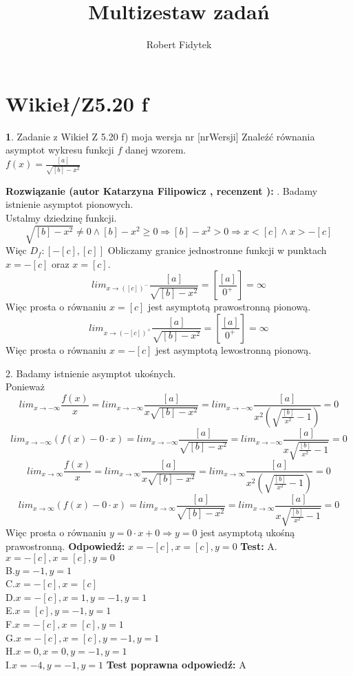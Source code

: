\documentclass[12pt, a4paper]{article}
\title{Multizestaw zadań}
\author{Robert Fidytek}
\date{}
\theoremstyle{definition} %
\newtheorem{zad}{}
\newcommand{\kategoria}[1]{\section{#1}} %
\newcommand{\zadStart}[1]{\begin{zad}#1\newline} %
\newcommand{\zadStop}{\end{zad}}   %
\newcommand{\rozwStart}[2]{\noindent \textbf{Rozwiązanie (autor #1 , recenzent #2): }\newline} %
\newcommand{\rozwStop}{\newline}                                            %
\newcommand{\odpStart}{\noindent \textbf{Odpowiedź:}\newline}    %
\newcommand{\odpStop}{\newline}                                             %
\newcommand{\testStart}{\noindent \textbf{Test:}\newline} %
\newcommand{\testStop}{\newline} %
\newcommand{\kluczStart}{\noindent \textbf{Test poprawna odpowiedź:}\newline} %
\newcommand{\kluczStop}{\newline} %
\begin{document}
\maketitle


\kategoria{Wikieł/Z5.20 f}
\zadStart{Zadanie z Wikieł Z 5.20 f) moja wersja nr [nrWersji]}
Znaleźć równania asymptot wykresu funkcji $f$ danej wzorem.\\
 $f(x)=\frac{[a]}{\sqrt{[b]-x^2}}$
\zadStop
\rozwStart{Katarzyna Filipowicz}{}
1. Badamy istnienie asymptot pionowych.\\
Ustalmy dziedzinę funkcji.\\
$$
\sqrt{[b]-x^2}\neq0 \wedge [b]-x^2\geq 0\Rightarrow  [b]-x^2>0 \Rightarrow x<[c] \wedge x>-[c]
$$
Więc $D_f:[-[c],[c]]$
Obliczamy granice jednostronne funkcji w punktach $x=-[c]$ oraz $x=[c]$.
$$
lim_{x\rightarrow ([c])^{-}}\frac{[a]}{\sqrt{[b]-x^2}}
=\left[\frac{[a]}{0^{+}}\right]=\infty
$$
Więc prosta o równaniu $x=[c]$ jest asymptotą prawostronną  pionową.
$$
lim_{x\rightarrow (-[c])^{+}}\frac{[a]}{\sqrt{[b]-x^2}}
=\left[\frac{[a]}{0^{+}}\right]=\infty
$$
Więc prosta o równaniu $x=-[c]$ jest asymptotą lewostronną pionową.


2. Badamy istnienie asymptot ukośnych.\\
Ponieważ
$$ 
lim_{x\rightarrow-\infty} \frac{f(x)}{x}
=lim_{x\rightarrow-\infty}\frac{[a]}{x\sqrt{[b]-x^2}}
=lim_{x\rightarrow-\infty}\frac{[a]}{x^2(\sqrt{\frac{[b]}{x^2}-1})}=0
$$ $$
lim_{x\rightarrow-\infty}(f(x)-0\cdot x)
=lim_{x\rightarrow-\infty}\frac{[a]}{\sqrt{[b]-x^2}}
=lim_{x\rightarrow-\infty} \frac{[a]}{x\sqrt{\frac{[b]}{x^2}-1}}=0
$$
$$ 
lim_{x\rightarrow\infty} \frac{f(x)}{x}
=lim_{x\rightarrow\infty}\frac{[a]}{x\sqrt{[b]-x^2}}
=lim_{x\rightarrow\infty}\frac{[a]}{x^2(\sqrt{\frac{[b]}{x^2}-1})}=0
$$ $$
lim_{x\rightarrow\infty}(f(x)-0\cdot x)
=lim_{x\rightarrow\infty}\frac{[a]}{\sqrt{[b]-x^2}}
=lim_{x\rightarrow\infty} \frac{[a]}{x\sqrt{\frac{[b]}{x^2}-1}}=0
$$
Więc prosta o równaniu $y=0\cdot x+0 \Rightarrow y=0$ jest asymptotą ukośną prawostronną.
\rozwStop
\odpStart
$x=-[c],x=[c],y=0$
\odpStop
\testStart
A.$x=-[c],x=[c],y=0$\\
B.$y=-1,y=1$\\
C.$x=-[c],x=[c]$\\
D.$x=-[c],x=1,y=-1,y=1$\\
E.$x=[c],y=-1,y=1$\\
F.$x=-[c],x=[c],y=1$\\
G.$x=-[c],x=[c],y=-1,y=1$\\
H.$x=0,x=0,y=-1,y=1$\\
I.$x=-4,y=-1,y=1$
\testStop
\kluczStart
A
\kluczStop
\end{document}
